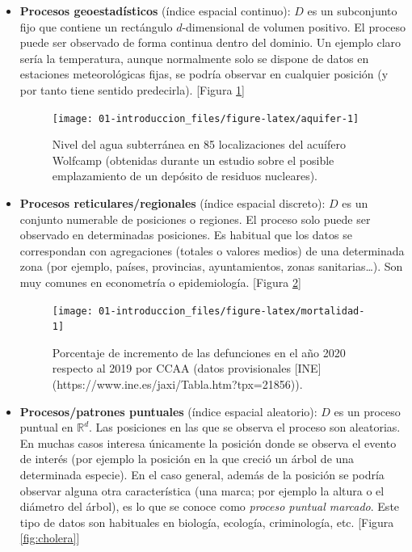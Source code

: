 \documentclass[
  spanish,
]{book}
\theoremstyle{break}
\theoremstyle{definition}
\theoremstyle{definition}
\theoremstyle{definition}
\theoremstyle{definition}
\theoremstyle{remark}
\begin{document}
\begin{itemize}
\item
  \textbf{Procesos geoestadísticos} (índice espacial continuo):
  \(D\) es un subconjunto fijo que contiene un rectángulo \(d\)-dimensional de volumen
  positivo. El proceso puede ser observado de forma continua dentro del dominio.
  Un ejemplo claro sería la temperatura, aunque normalmente solo se dispone de datos en
  estaciones meteorológicas fijas, se podría observar en cualquier posición
  (y por tanto tiene sentido predecirla). {[}Figura \ref{fig:aquifer}{]}

  \begin{figure}[!htb]

  {\centering \texttt{[image: 01-introduccion\_files/figure-latex/aquifer-1]} 

  }

  \caption{Nivel del agua subterránea en 85 localizaciones del acuífero Wolfcamp (obtenidas durante un estudio sobre el posible emplazamiento de un depósito de residuos nucleares).}\label{fig:aquifer}
  \end{figure}
\item
  \textbf{Procesos reticulares/regionales} (índice espacial discreto):
  \(D\) es un conjunto numerable de posiciones o regiones. El proceso solo puede ser
  observado en determinadas posiciones. Es habitual que los datos se correspondan
  con agregaciones (totales o valores medios) de una determinada zona (por ejemplo,
  países, provincias, ayuntamientos, zonas sanitarias\ldots). Son muy comunes en
  econometría o epidemiología. {[}Figura \ref{fig:mortalidad}{]}

  \begin{figure}[!htb]

  {\centering \texttt{[image: 01-introduccion\_files/figure-latex/mortalidad-1]} 

  }

  \caption{Porcentaje de incremento de las defunciones en el año 2020 respecto al 2019 por CCAA (datos provisionales [INE](https://www.ine.es/jaxi/Tabla.htm?tpx=21856)).}\label{fig:mortalidad}
  \end{figure}
\item
  \textbf{Procesos/patrones puntuales} (índice espacial aleatorio):
  \(D\) es un proceso puntual en \(\mathbb{R}^{d}\). Las posiciones en las que se
  observa el proceso son aleatorias. En muchas casos interesa únicamente la posición
  donde se observa el evento de interés (por ejemplo la posición en la que creció
  un árbol de una determinada especie). En el caso general, además de la posición
  se podría observar alguna otra característica (una marca; por ejemplo la altura o
  el diámetro del árbol), es lo que se conoce como \emph{proceso puntual marcado}.
  Este tipo de datos son habituales en biología, ecología, criminología, etc.
  {[}Figura \ref{fig:cholera}{]}


\end{itemize}
\end{document}
